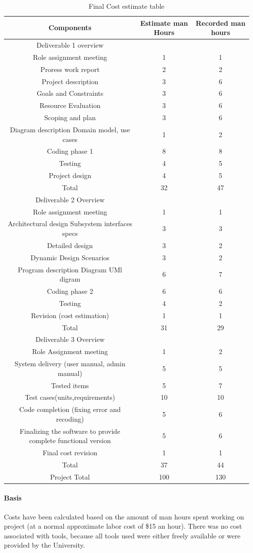\documentclass{article}
\begin{document}
\begin{table}[ht]
\caption{Final Cost estimate table }
\centering

\begin{tabular}{|c |c |c| }
\hline \hline %
Components &  Estimate man Hours  &  Recorded man hours \\[0.1ex]
\hline
Deliverable 1 overview\\
\hline
Role assignment meeting	& 1&1\\
Proress work report	 & 2 & 2\\
Project description & 3&6\\
Goals and Constraints & 3& 6\\
Resource Evaluation & 3 & 6\\
Scoping and plan & 	3& 6\\
Diagram description Domain model, use cases &  1 & 2\\
Coding phase 1 & 8 & 8\\
Testing  & 4 & 5\\
Project design & 4 & 5\\
Total & 32 & 	47\\[1ex]
\hline
Deliverable 2 Overview\\
\hline		
Role assignment meeting &1 &1\\
Architectural design  Subsystem interfaces specs &3&3\\
Detailed design &3&2\\
Dynamic Design Scenarios	& 3&2\\
Program description Diagram  UMl digram & 6 & 7\\
Coding phase 2 & 6&6\\
Testing &4&2\\
Revision (cost estimation) & 1&1\\
Total &31&29\\
\hline
Deliverable 3 Overview \\
\hline		
Role Assignment meeting 	&1&	2\\
System delivery (user manual, admin manual)&5&5\\
Tested items 	&5&7\\
Test cases(units,requirements) &	10&10\\	
Code completion (fixing error and recoding)&	5&6\\
Finalizing the software to provide complete functional version & 5	&6\\
Final cost revision & 1 & 1\\
Total	&37&44\\
\hline
Project Total &100&130\\
\hline
\end{tabular}
\label{table:nonlin}
\end{table}

\paragraph{Basis} Costs have been calculated based on the amount of man hours spent working on project (at a normal approximate labor cost of \$15 an hour). There was no cost associated with tools, because all tools used were either freely available or were provided by the University.
\end{document}

